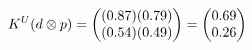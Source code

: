 \documentclass[preview]{standalone}
\begin{document}
\begin{align*}
\special{dvisvgm:raw <g id='unique000'>}K^U(d \otimes p) = \begin{pmatrix} (0.87)(0.79) \\ (0.54)(0.49) \end{pmatrix} = \begin{pmatrix} 0.69 \\ 0.26 \end{pmatrix}\special{dvisvgm:raw </g>}
\end{align*}
\end{document}
